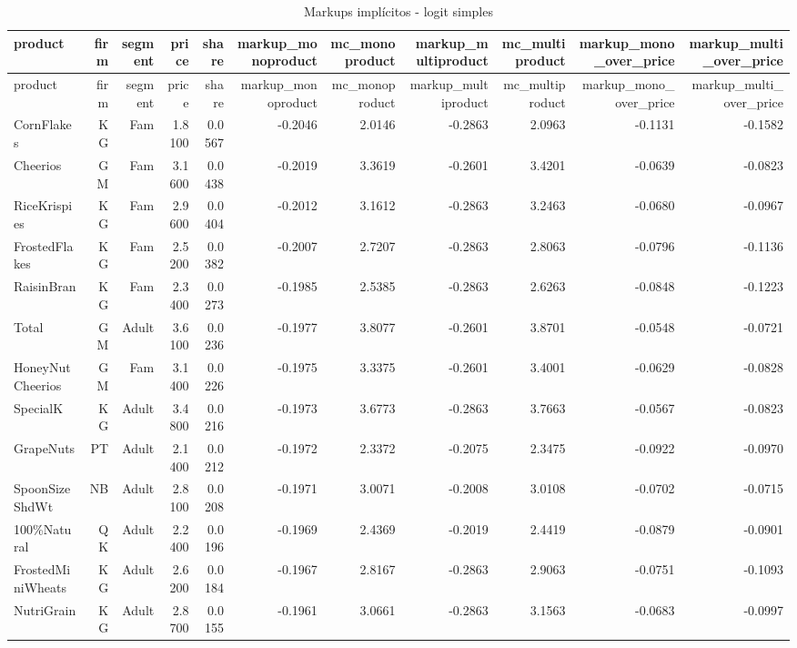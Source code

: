 \begingroup
\scriptsize
\begin{longtable}{@{}lrrrrrrrrrr@{}}
\caption{Markups implícitos - logit simples}\label{tab:markups}\\
\toprule
product & firm & segment & price & share & markup\_monoproduct & mc\_monoproduct & markup\_multiproduct & mc\_multiproduct & markup\_mono\_over\_price & markup\_multi\_over\_price \\
\midrule
\endfirsthead
\toprule
product & firm & segment & price & share & markup\_monoproduct & mc\_monoproduct & markup\_multiproduct & mc\_multiproduct & markup\_mono\_over\_price & markup\_multi\_over\_price \\
\midrule
\endhead
CornFlakes & KG & Fam & 1.8100 & 0.0567 & -0.2046 & 2.0146 & -0.2863 & 2.0963 & -0.1131 & -0.1582 \\
Cheerios & GM & Fam & 3.1600 & 0.0438 & -0.2019 & 3.3619 & -0.2601 & 3.4201 & -0.0639 & -0.0823 \\
RiceKrispies & KG & Fam & 2.9600 & 0.0404 & -0.2012 & 3.1612 & -0.2863 & 3.2463 & -0.0680 & -0.0967 \\
FrostedFlakes & KG & Fam & 2.5200 & 0.0382 & -0.2007 & 2.7207 & -0.2863 & 2.8063 & -0.0796 & -0.1136 \\
RaisinBran & KG & Fam & 2.3400 & 0.0273 & -0.1985 & 2.5385 & -0.2863 & 2.6263 & -0.0848 & -0.1223 \\
Total & GM & Adult & 3.6100 & 0.0236 & -0.1977 & 3.8077 & -0.2601 & 3.8701 & -0.0548 & -0.0721 \\
HoneyNutCheerios & GM & Fam & 3.1400 & 0.0226 & -0.1975 & 3.3375 & -0.2601 & 3.4001 & -0.0629 & -0.0828 \\
SpecialK & KG & Adult & 3.4800 & 0.0216 & -0.1973 & 3.6773 & -0.2863 & 3.7663 & -0.0567 & -0.0823 \\
GrapeNuts & PT & Adult & 2.1400 & 0.0212 & -0.1972 & 2.3372 & -0.2075 & 2.3475 & -0.0922 & -0.0970 \\
SpoonSizeShdWt & NB & Adult & 2.8100 & 0.0208 & -0.1971 & 3.0071 & -0.2008 & 3.0108 & -0.0702 & -0.0715 \\
100\%Natural & QK & Adult & 2.2400 & 0.0196 & -0.1969 & 2.4369 & -0.2019 & 2.4419 & -0.0879 & -0.0901 \\
FrostedMiniWheats & KG & Adult & 2.6200 & 0.0184 & -0.1967 & 2.8167 & -0.2863 & 2.9063 & -0.0751 & -0.1093 \\
NutriGrain & KG & Adult & 2.8700 & 0.0155 & -0.1961 & 3.0661 & -0.2863 & 3.1563 & -0.0683 & -0.0997 \\

\end{longtable}
